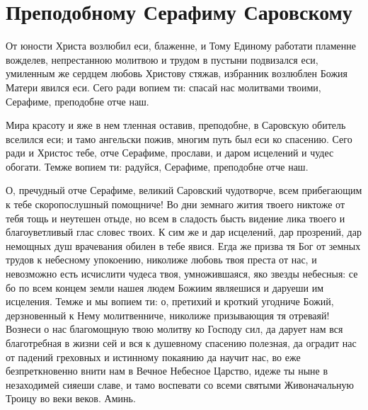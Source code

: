 \section{Преподобному Серафиму Саровскому}\begin{mymulticols}


От юности Христа возлюбил еси, блаженне, и Тому Единому работати пламенне вожделев, непрестанною молитвою и трудом в пустыни подвизался еси, умиленным же сердцем любовь Христову стяжав, избранник возлюблен Божия Матери явился еси. Сего ради вопием ти: спасай нас молитвами твоими, Серафиме, преподобне отче наш.


Мира красоту и яже в нем тленная оставив, преподобне, в Саровскую обитель вселился еси; и тамо ангельски пожив, многим путь был еси ко спасению. Сего ради и Христос тебе, отче Серафиме, прослави, и даром исцелений и чудес обогати. Темже вопием ти: радуйся, Серафиме, преподобне отче наш.


О, пречудный отче Серафиме, великий Саровский чудотворче, всем прибегающим к тебе скоропослушный помощниче! Во дни земнаго жития твоего никтоже от тебя тощь и неутешен отыде, но всем в сладость бысть видение лика твоего и благоуветливый глас словес твоих. К сим же и дар исцелений, дар прозрений, дар немощных душ врачевания обилен в тебе явися. Егда же призва тя Бог от земных трудов к небесному упокоению, николиже любовь твоя преста от нас, и невозможно есть исчислити чудеса твоя, умножившаяся, яко звезды небесныя: се бо по всем концем земли нашея людем Божиим являешися и даруеши им исцеления. Темже и мы вопием ти: о, претихий и кроткий угодниче Божий, дерзновенный к Нему молитвенниче, николиже призывающия тя отреваяй! Вознеси о нас благомощную твою молитву ко Господу сил, да дарует нам вся благотребная в жизни сей и вся к душевному спасению полезная, да оградит нас от падений греховных и истинному покаянию да научит нас, во еже безпреткновенно внити нам в Вечное Небесное Царство, идеже ты ныне в незаходимей сияеши славе, и тамо воспевати со всеми святыми Живоначальную Троицу во веки веков. Аминь.

\end{mymulticols}

